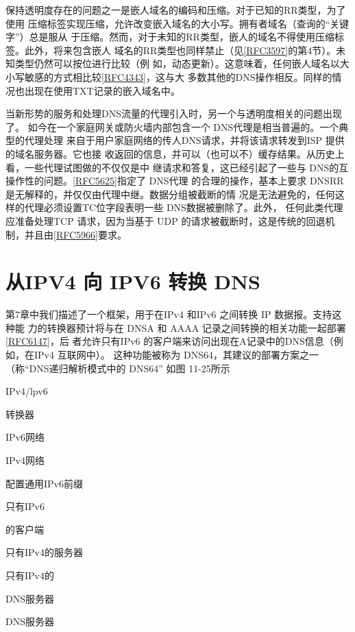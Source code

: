 保持透明度存在的问题之一是嵌人域名的编码和压缩。对于已知的RR类型，为了使用
压缩标签实现压缩，允许改变嵌入域名的大小写。拥有者域名（查询的“关键字”）总是服从
于压缩。然而，对于未知的RR类型，嵌人的域名不得使用压缩标签。此外，将来包含嵌人
域名的RR类型也同样禁止（见\href{https://www.rfc-editor.org/rfc/rfc3597}{[RFC3597]}的第4节）。未知类型仍然可以按位进行比较（例
如，动态更新）。这意味着，任何嵌人域名以大小写敏感的方式相比较\href{https://www.rfc-editor.org/rfc/rfc4343}{[RFC4343]}，这与大
多数其他的DNS操作相反。同样的情况也出现在使用TXT记录的嵌入域名中。

当新形势的服务和处理DNS流量的代理引入时，另一个与透明度相关的问题出现了。
如今在一个家庭网关或防火墙内部包含一个 DNS代理是相当普遍的。一个典型的代理处理
来自于用户家庭网络的传人DNS请求，并将该请求转发到ISP 提供的域名服务器。它也接
收返回的信息，并可以（也可以不）缓存结果。从历史上看，一些代理试图做的不仅仅是中
继请求和答复，这已经引起了一些与 DNS的互操作性的问题。\href{https://www.rfc-editor.org/rfc/rfc5625}{[RFC5625]}指定了 DNS代理
的合理的操作，基本上要求 DNSRR 是无解释的，并仅仅由代理中继。数据分组被截断的情
况是无法避免的，任何这样的代理必须设置TC位字段表明一些 DNS数据被删除了。此外，
任何此类代理应准备处理TCP 请求，因为当基于 UDP 的请求被截断时，这是传统的回退机
制，并且由\href{https://www.rfc-editor.org/rfc/rfc5966}{[RFC5966]}要求。

\section{从IPV4 向 IPV6 转换 DNS}

第7章中我们描述了一个框架，用于在IPv4 和IPv6 之间转换 IP 数据报。支持这种能
力的转换器预计将与在 DNSA 和 AAAA 记录之间转换的相关功能一起部署\href{https://www.rfc-editor.org/rfc/rfc6147}{[RFC6147]}，后
者允许只有IPv6 的客户端来访问出现在A记录中的DNS信息（例如，在IPv4 互联网中）。
这种功能被称为 DNS64，其建议的部署方案之一（称“DNS递归解析模式中的 DNS64”
如图 11-25所示


IPv4/lpv6

转换器

IPv6网络

IPv4网络

配置通用IPv6前缀

只有IPv6

的客户端

只有IPv4的服务器

只有IPv4的

DNS服务器

DNS服务器

